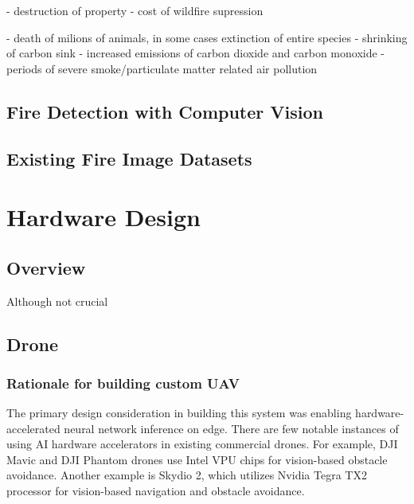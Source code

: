   - destruction of property
  - cost of wildfire supression

  - death of milions of animals, in some cases extinction of entire species\cite{}
  - shrinking of carbon sink
  - increased emissions of carbon dioxide and carbon monoxide %
  - periods of severe smoke/particulate matter related air pollution



  


  \subsection{Fire Detection with Computer Vision}

  \subsection{Existing Fire Image Datasets}

\section{Hardware Design}\label{sec:hardware}
  
  \subsection{Overview}
  Although not crucial

  \subsection{Drone}

  \subsubsection{Rationale for building custom UAV}

  The primary design consideration in building this system was enabling hardware-accelerated neural network inference on edge.
  There are few notable instances of using AI hardware accelerators in existing commercial drones.
  For example, DJI Mavic and DJI Phantom drones use Intel VPU chips for vision-based obstacle avoidance. 
  Another example is Skydio 2, which utilizes Nvidia Tegra TX2 processor for vision-based navigation and obstacle avoidance.


